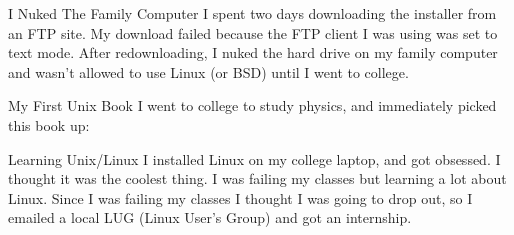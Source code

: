 \documentclass[14pt]{beamer}
\begin{document}
\begin{frame}{I Nuked The Family Computer}
  I spent two days downloading the installer from an FTP site. My download
  failed because the FTP client I was using was set to text mode.
  \newline
  \newline
  After redownloading, I nuked the hard drive on my family computer and wasn't
  allowed to use Linux (or BSD) until I went to college.
\end{frame}

\begin{frame}{My First Unix Book}
  I went to college to study physics, and immediately picked this book up:
  \newline
  \newline
\end{frame}

\begin{frame}{Learning Unix/Linux}
  I installed Linux on my college laptop, and got obsessed. I thought it was the
  coolest thing. I was failing my classes but learning a lot about Linux.
  \newline
  \newline
  Since I was failing my classes I thought I was going to drop out, so I emailed
  a local LUG (Linux User's Group) and got an internship.
\end{frame}
\end{document}
